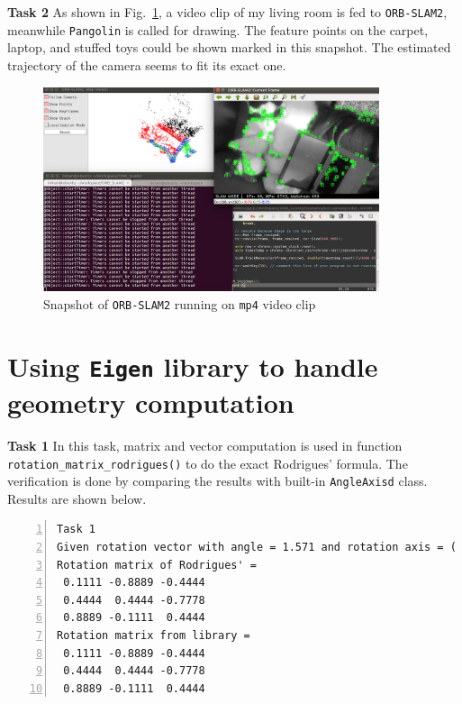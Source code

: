 \documentclass[12pt,a4paper]{article}
\begin{document}
    \textsf{\textbf{Task 2}}
    As shown in Fig.~\ref{fig:orbslam_snapshot},
    a video clip of my living room is fed to \texttt{ORB-SLAM2},
    meanwhile \texttt{Pangolin} is called for drawing.
    The feature points on the carpet, laptop, and stuffed toys
    could be shown marked in this snapshot.
    The estimated trajectory of the camera seems to fit its exact one.

    \begin{figure}[!h]
        \centering
        \includegraphics[height=6cm]{fig/orbslam_snapshot.png}
        \caption{Snapshot of \texttt{ORB-SLAM2} running on \texttt{mp4} video clip}
        \label{fig:orbslam_snapshot}
    \end{figure}
    
    \section{Using \texttt{Eigen} library to handle geometry computation}
    \textsf{\textbf{Task 1}}
    In this task, matrix and vector computation is used in function
    \texttt{rotation\_matrix\_rodrigues()} to do the exact Rodrigues' formula.
    The verification is done by comparing the results with 
    built-in \texttt{AngleAxisd} class. Results are shown below.
    \begin{lstlisting}[frame=single,numbers=left] 
Task 1
Given rotation vector with angle = 1.571 and rotation axis = ( 0.3333 -0.6667  0.6667)^T
Rotation matrix of Rodrigues' =
 0.1111 -0.8889 -0.4444
 0.4444  0.4444 -0.7778
 0.8889 -0.1111  0.4444
Rotation matrix from library =
 0.1111 -0.8889 -0.4444
 0.4444  0.4444 -0.7778
 0.8889 -0.1111  0.4444 
    \end{lstlisting}
\end{document}
